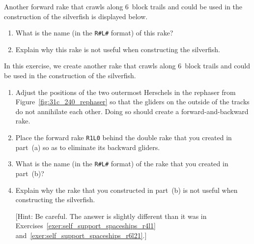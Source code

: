 \begin{multicols}{2}
\mfilbreak


\begin{problem}\label{exer:self_support_spaceships_r6l21}
	Another forward rake that crawls along $6$~block trails and could be used in the construction of the silverfish is displayed below.
	\begin{center}
	\end{center}
	
	\begin{enumerate}[label=\bf\color{ocre}(\alph*)]
		\item What is the name (in the \texttt{R\#L\#} format) of this rake?
		
		\item Explain why this rake is not useful when constructing the silverfish.
	\end{enumerate}
\end{problem}


\mfilbreak


\begin{problem}\label{exer:self_support_spaceships_r2l16}
	In this exercise, we create another rake that crawls along $6$~block trails and could be used in the construction of the silverfish.
	
	\begin{enumerate}[label=\bf\color{ocre}(\alph*)]
		\item Adjust the positions of the two outermost Herschels in the rephaser from Figure~\ref{fig:31c_240_rephaser} so that the gliders on the outside of the tracks do not annihilate each other. Doing so should create a forward-and-backward rake.
		
		\item Place the forward rake \texttt{R1L0} behind the double rake that you created in part~(a) so as to eliminate its backward gliders.
		
		\item What is the name (in the \texttt{R\#L\#} format) of the rake that you created in part~(b)?
		
		\item Explain why the rake that you constructed in part~(b) is not useful when constructing the silverfish.
		
		[Hint: Be careful. The answer is slightly different than it was in Exercises~\ref{exer:self_support_spaceships_r4l1} and~\ref{exer:self_support_spaceships_r6l21}.]
	\end{enumerate}
\end{problem}


\end{multicols}
\normalsize\vspace*{0.01cm}
